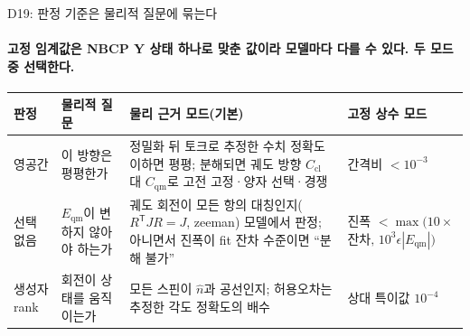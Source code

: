 \begin{frame}[label=state-selection-criteria]{D19: 판정 기준은 물리적 질문에 묶는다}
  \framesubtitle{고정 임계값은 NBCP Y 상태 하나로 맞춘 값이라 모델마다 다를 수 있다. 두 모드 중 선택한다.}
  \small
  \begin{tabularx}{\textwidth}{@{}P{2.0cm}P{3.2cm}YP{2.9cm}@{}}
    \toprule
    판정 & 물리적 질문 & 물리 근거 모드(기본) & 고정 상수 모드 \\
    \midrule
    영공간 & 이 방향은 평평한가 & 정밀화 뒤 토크로 추정한 수치 정확도 이하면 평평; 분해되면 궤도 방향 $C_{\mathrm{cl}}$ 대 $C_{\mathrm{qm}}$로 고전 고정·양자 선택·경쟁 & 간격비 $<10^{-3}$ \\
    선택 없음 & $E_{\mathrm{qm}}$이 변하지 않아야 하는가 & 궤도 회전이 모든 항의 대칭인지($R^{\mathsf T}JR=J$, zeeman) 모델에서 판정; 아니면서 진폭이 fit 잔차 수준이면 ``분해 불가'' & 진폭 $<\max(10\times$잔차$,\,10^3\epsilon|E_{\mathrm{qm}}|)$ \\
    생성자 rank & 회전이 상태를 움직이는가 & 모든 스핀이 $\hat n$과 공선인지; 허용오차는 추정한 각도 정확도의 배수 & 상대 특이값 $10^{-4}$ \\
    \bottomrule
  \end{tabularx}
  \par\medskip
\end{frame}

